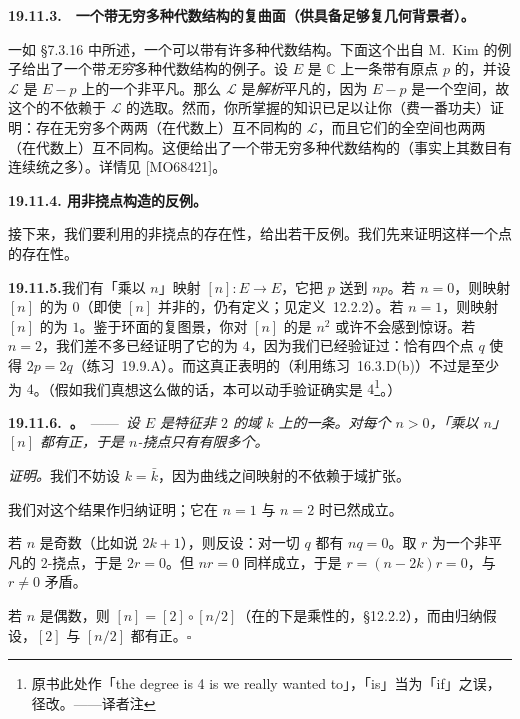 \textbf{19.11.3.}\ \extrahard\ \textbf{一个带无穷多种代数结构的复曲面（供具备足够复几何背景者）。}

一如 \S7.3.16 中所述，一个\trComplex\trManifold{}可以带有许多种代数结构。下面这个出自 M.~Kim 的例子给出了一个带\emph{无穷}多种代数结构的例子。设 $E$ 是 $\mathbb{C}$ 上一条带有原点 $p$ 的\trEllipticCurve，并设 $\mathscr{L}$ 是 $E-p$ 上的一个非平凡\trLineBundle。那么 $\mathscr{L}$ 是\emph{解析}平凡的，因为 $E-p$ 是一个\trStein{}空间，故这个\trTotalSpace{}的\trAnalytification{}不依赖于 $\mathscr{L}$ 的选取。然而，你所掌握的知识已足以让你（费一番功夫）证明：存在无穷多个两两（在代数上）互不同构的 $\mathscr{L}$，而且它们的全空间也两两（在代数上）互不同构。这便给出了一个带无穷多种代数结构的\trComplex\trSurface（事实上其数目有连续统之多）。详情见 [MO68421]。

\textbf{19.11.4. 用非挠点构造的反例。}

接下来，我们要利用\trComplex\trEllipticCurve{}的非挠点的存在性，给出若干反例。我们先来证明这样一个点的存在性。

\textbf{19.11.5.}\quad 我们有「乘以 $n$」映射 $[n]\colon E\to E$，它把 $p$ 送到 $np$。若 $n=0$，则映射 $[n]$ 的\trDegree{}为 $0$（即使 $[n]$ 并非\trDominant{}的，\trDegree{}仍有定义；见\mbox{定义~12.2.2}）。若 $n=1$，则映射 $[n]$ 的\trDegree{}为 $1$。鉴于环面的复图景，你对 $[n]$ 的\trDegree{}是 $n^2$ 或许不会感到惊讶。若 $n=2$，我们差不多已经证明了它的\trDegree{}为 $4$，因为我们已经验证过：恰有四个点 $q$ 使得 $2p=2q$（\mbox{练习~19.9.A}）。而这真正表明的（利用\mbox{练习~16.3.D(b)}）不过是\trDegree{}至少为 $4$。（假如我们真想这么做的话，本可以动手验证\trDegree{}确实是 $4$\footnote{原书此处作「the degree is 4 is we really wanted to」，「is」当为「if」之误，径改。——译者注}。）

\textbf{19.11.6.\ \trhProposition。}\ ——\ \emph{设 $E$ 是特征非 $2$ 的域 $k$ 上的一条\trEllipticCurve。对每个 $n>0$，「乘以 $n$」\trMorphism{} $[n]$ 都有正\trDegree，于是 $n$-挠点只有有限多个。}

\emph{证明。}\quad 我们不妨设 $k=\bar{k}$，因为曲线之间映射的\trDegree{}不依赖于域扩张。

我们对这个结果作归纳证明；它在 $n=1$ 与 $n=2$ 时已然成立。

若 $n$ 是奇数（比如说 $2k+1$），则反设：对一切\trClosedPoint{} $q$ 都有 $nq=0$。取 $r$ 为一个非平凡的 $2$-挠点，于是 $2r=0$。但 $nr=0$ 同样成立，于是 $r=(n-2k)r=0$，与 $r\ne 0$ 矛盾。

若 $n$ 是偶数，则 $[n]=[2]\circ[n/2]$（\trDegree{}在\trRationalMap{}的\trComposition{}下是乘性的，\S12.2.2），而由归纳假设，$[2]$ 与 $[n/2]$ 都有正\trDegree。\hfill$\square$

